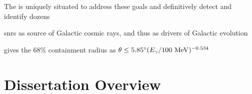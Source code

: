 The \lat{} is uniquely situated to address these goals and definitively detect and identify dozens \snrs

snrs as source of Galactic cosmic rays, and thus as drivers of Galactic evolution

\cite{Thomson93} gives the 68\% containment radius as $\theta \leq 5.85^\circ (E_\gamma /100 ~\mathrm{MeV} )^{-0.534}$

\section{Dissertation Overview}



